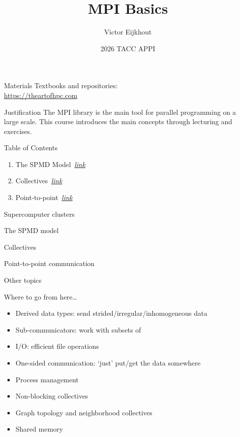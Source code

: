 \documentclass[11pt]{beamer}
\begin{document}
\author[Eijkhout]{Victor Eijkhout}
\date[2026]{2026 TACC APPI}
\title[MPI]{MPI Basics}
\maketitle

\begin{frame}[containsverbatim]{Materials}
    Textbooks and repositories:\\
    \url{https://theartofhpc.com}
\end{frame}

\begin{frame}{Justification}
  The MPI library is the main tool
  for parallel programming on a large scale.
  This course introduces the main concepts
  through lecturing and exercises.
\end{frame}

\begin{frame}{Table of Contents}
  \begin{enumerate}
  \item The SPMD Model~\hyperlink{sec:spmd}{\textsl{link}}
  \item Collectives~\hyperlink{sec:collectives}{\textsl{link}}
  \item Point-to-point~\hyperlink{sec:ptp}{\textsl{link}}
  \end{enumerate}
\end{frame}

 {Supercomputer clusters}
\lstset{language=slurm}



\lstset{language=mpi}
 {The SPMD model}
\label{sec:spmd}


 {Collectives}
\label{sec:collectives}


 {Point-to-point communication}


 {Other topics}

\begin{numberedframe}{Where to go from here\ldots}
  \begin{itemize}
  \item Derived data types: send strided/irregular/inhomogeneous data
  \item Sub-communicators: work with subsets of 
  \item I/O: efficient file operations
  \item One-sided communication: `just' put/get the data somewhere
  \item Process management
  \item Non-blocking collectives
  \item Graph topology and neighborhood collectives
  \item Shared memory
  \end{itemize}
\end{numberedframe}



\end{document}
